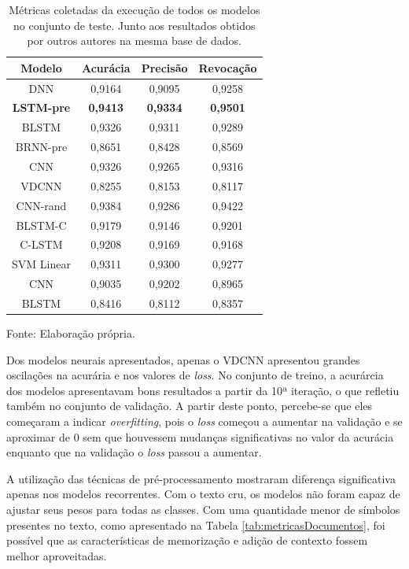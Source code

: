\begin{table}[ht]
    \centering
    \caption[Métricas dos modelos no conjunto de teste]{Métricas coletadas da execução de todos os modelos no conjunto de teste. Junto aos resultados obtidos por outros autores na mesma base de dados.}
    \label{tab:modelosMetricas}
    \begin{tabular}{|c|c|c|c|}
        \hline
        \textbf{Modelo} & \textbf{Acurácia} & \textbf{Precisão} & \textbf{Revocação} \\
        \hline
        DNN & 0,9164 & 0,9095 & 0,9258 \\ 
        \hline
        \textbf{LSTM-pre} & \textbf{0,9413} & \textbf{0,9334} & \textbf{0,9501} \\
        \hline
        BLSTM & 0,9326 & 0,9311 & 0,9289 \\ 
        \hline
        BRNN-pre & 0,8651 & 0,8428 & 0,8569 \\ 
        \hline
        CNN & 0,9326 & 0,9265 & 0,9316 \\ 
        \hline
        VDCNN & 0,8255 & 0,8153 & 0,8117 \\ 
        \hline
        CNN-rand & 0,9384 & 0,9286 & 0,9422 \\ 
        \hline
        BLSTM-C & 0,9179 & 0,9146 & 0,9201 \\ 
        \hline
        C-LSTM & 0,9208 & 0,9169 & 0,9168 \\
        \hline
        SVM Linear & 0,9311 & 0,9300 & 0,9277 \\ 
        \hline
        CNN \cite{da_silva_document_2018} & 0,9035 & 0,9202 & 0,8965 \\
        \hline
        BLSTM \cite{braz_document_2018} &	0,8416 & 0,8112 & 0,8357 \\
        \hline
    \end{tabular}\par Fonte: Elaboração própria.
\end{table}

Dos modelos neurais apresentados, apenas o VDCNN apresentou grandes oscilações na acurária e nos valores de \textit{loss}.  No conjunto de treino, a acurárcia dos modelos apresentavam bons resultados a partir da 10ª iteração, o que refletiu também no conjunto de validação. A partir deste ponto, percebe-se que eles começaram a indicar \textit{overfitting}, pois o \textit{loss} começou a aumentar na validação e se aproximar de 0 sem que houvessem mudanças significativas no valor da acurácia enquanto que na validação o \textit{loss} passou a aumentar.

A utilização das técnicas de pré-processamento mostraram diferença significativa apenas nos modelos recorrentes. Com o texto cru, os modelos não foram capaz de ajustar seus pesos para todas as classes. Com uma quantidade menor de símbolos presentes no texto, como apresentado na Tabela \ref{tab:metricasDocumentos}, foi possível que as características de memorização e adição de contexto fossem melhor aproveitadas.